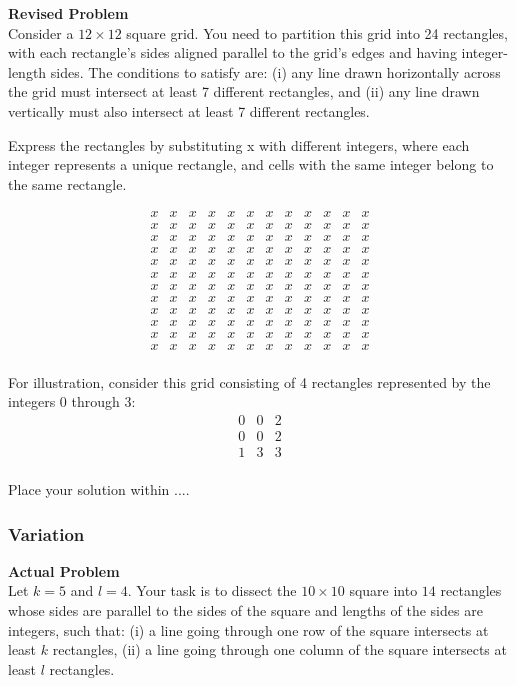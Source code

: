 \textbf{Revised Problem}\\
Consider a $12 \times 12$ square grid. You need to partition this grid into 24 rectangles, with each rectangle's sides aligned parallel to the grid's edges and having integer-length sides. The conditions to satisfy are: (i) any line drawn horizontally across the grid must intersect at least 7 different rectangles, and (ii) any line drawn vertically must also intersect at least 7 different rectangles.

Express the rectangles by substituting x with different integers, where each integer represents a unique rectangle, and cells with the same integer belong to the same rectangle.

$$\begin{array}{cccccccccccc}
x & x & x & x & x & x & x & x & x & x & x & x \\
x & x & x & x & x & x & x & x & x & x & x & x \\
x & x & x & x & x & x & x & x & x & x & x & x \\
x & x & x & x & x & x & x & x & x & x & x & x \\
x & x & x & x & x & x & x & x & x & x & x & x \\
x & x & x & x & x & x & x & x & x & x & x & x \\
x & x & x & x & x & x & x & x & x & x & x & x \\
x & x & x & x & x & x & x & x & x & x & x & x \\
x & x & x & x & x & x & x & x & x & x & x & x \\
x & x & x & x & x & x & x & x & x & x & x & x \\
x & x & x & x & x & x & x & x & x & x & x & x \\
x & x & x & x & x & x & x & x & x & x & x & x \\
\end{array}$$

For illustration, consider this grid consisting of 4 rectangles represented by the integers 0 through 3:
$$
\begin{array}{ccc}
0 & 0 & 2 \\
0 & 0 & 2 \\
1 & 3 & 3 \\
\end{array}
$$

Place your solution within $\boxed{...}$.

\subsubsection{Variation}
\textbf{Actual Problem}\\
Let $k = 5$ and $l = 4$. Your task is to dissect the $10 \times 10$ square into $14$ rectangles whose sides are parallel to the sides of the square
and lengths of the sides are integers, such that: (i) a line going through one row of the square intersects at least $k$ rectangles, (ii) a line going through one column of the square
intersects at least $l$ rectangles.

